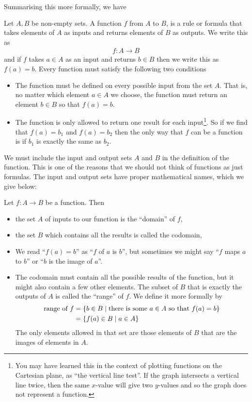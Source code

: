 Summarising this more formally, we have
\begin{defn}
\label{def function}
 Let $A, B$ be non-empty sets. A function $f$ from $A$ to $B$, is a rule or
formula that takes elements of $A$ as inputs and returns elements of $B$ as
outputs. We write this as
\begin{align*}
  f: A \to B
\end{align*}
and if $f$ takes $a \in A$ as an input and returns $b\in B$ then we write this
as $f(a) = b$. Every function must satisfy the following two conditions
\begin{itemize}
\item The function must be defined on every possible input from the set $A$.
That is, no matter which element $a \in A$ we choose, the function must return
an element $b \in B$ so that $f(a)=b$.

\item The function is only allowed to return one result for each
input\footnote{You may have learned this in the context of plotting functions on
the Cartesian plane, as ``the vertical line test''. If the graph intersects a
vertical line twice, then the same $x$-value will give two $y$-values and so
the graph does not represent a function.}. So if we find that $f(a)=b_1$ and
$f(a)=b_2$ then the only way that $f$ can be a function is if $b_1$ is exactly
the same as $b_2$.
\end{itemize}
\end{defn}
We must include the input and output sets $A$ and $B$ in the definition of the
function. This is one of the reasons that we should not think of
functions as just formulas. The input and output sets have proper mathematical
names, which we give below:
\begin{defn}
Let $f:A \to B$ be a function. Then
\begin{itemize}
\item the set $A$ of inputs to our function is the ``domain'' of $f$,
\item the set $B$ which contains all the results is called the codomain,
\item We read ``$f(a) = b$'' as ``$f$ of $a$ is $b$'', but sometimes we might
say ``$f$ maps $a$ to $b$'' or ``$b$ is the image of $a$''.

\item The codomain must contain all the possible results of the function, but
it might also contain a few other elements. The subset of $B$ that is
exactly the outputs of $A$ is called the ``range'' of $f$. We define it more
formally by
\begin{align*}
	\text{range of } f &= \left\{b \in B \;|\; \text{there is some } a \in
A \text{ so that } f(a) = b\right\} \\
  &= \left\{f(a) \in B \;|\; a \in A\right\}
\end{align*}
  The only elements allowed in that set are those elements of $B$ that are the
images of elements in $A$.
\end{itemize}
\end{defn}


